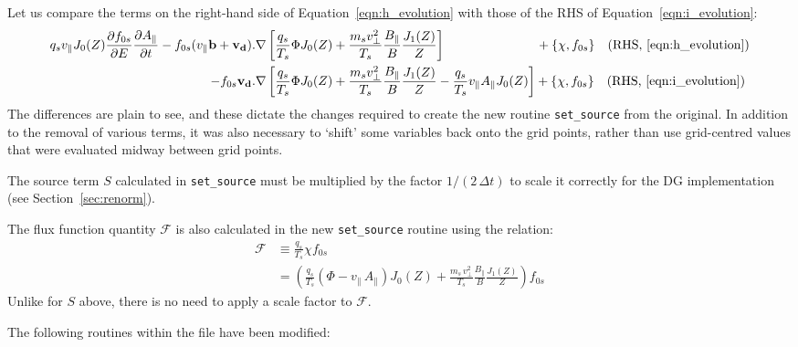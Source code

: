 \documentclass[10pt,a4paper]{article}
\newcommand{\dd}{\partial}
\begin{document}
\begin{itemize}
Let us compare the terms on the right-hand side of
Equation~\ref{eqn:h_evolution} with those of the RHS of
Equation~\ref{eqn:i_evolution}:
\begin{align*}
  q_s v_\parallel J_0(Z) \frac{\dd f_{0s}}{\dd E} \frac{\dd
    A_\parallel}{\dd t} - f_{0s}(v_\parallel \mathbf{b} + \mathbf{v_d}).&\nabla 
  \left[ \frac{q_s}{T_s} \Phi J_0(Z) +\frac{m_s v_\perp^2}{T_s}
    \frac{B_\parallel}{B} \frac{J_1(Z)}{Z} \right]
  \;\;\;\;\;\;\;\;\;\;\;\;\;\;\;\;\;\;\;\;\;\;\;\;\;\; + \left\{ \chi,
    f_{0s}\right\} \;\;\;
  \mbox{(RHS, \ref{eqn:h_evolution})}\\
  - f_{0s} \mathbf{v_d}.&\nabla
  \left[ \frac{q_s}{T_s} \Phi J_0(Z) + \frac{m_s v_\perp^2}{T_s} \frac{B_\parallel}{B}
    \frac{J_1(Z)}{Z} - \frac{q_s}{T_s} v_\parallel A_\parallel J_0(Z) \right]
  + \left\{ \chi, f_{0s}\right\}\;\;\;\mbox{(RHS, \ref{eqn:i_evolution})}
\end{align*}
The differences are plain to see, and these dictate the changes required to
create the new routine \texttt{set\_source} from the original. In addition to
the removal of various terms, it was also necessary to `shift' some variables
back onto the grid points, rather than use grid-centred values that were
evaluated midway between grid points.

The source term $S$ calculated in \texttt{set\_source} must be multiplied by the
factor $1/(2\,\Delta t)$ to scale it correctly for the DG implementation (see
Section~\ref{sec:renorm}).

The flux function quantity $\mathcal{F}$ is also calculated in the new
\texttt{set\_source} routine using the relation:
\begin{align*}
\mathcal{F} & \equiv \frac{q_s}{T_s} \chi f_{0s} \\
& = \left( \frac{q_s}{T_s}(\Phi - v_\parallel \, A_\parallel) J_0(Z) + \frac{m_s \,
v_\perp^2}{T_s} \frac{B_\parallel}{B} \frac{J_1(Z)}{Z} \right) f_{0s}
\end{align*}
Unlike for $S$ above, there is no need to apply a scale factor to $\mathcal{F}$.

\end{itemize}

The following routines within the file have been modified:
\end{document}
